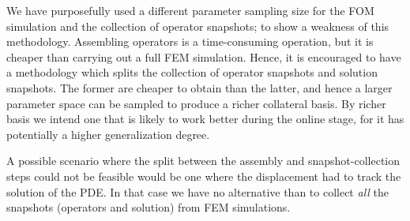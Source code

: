 \documentclass[../../thesis.tex]{subfiles}
\begin{document}
We have purposefully used a different parameter sampling size 
for the FOM simulation and the collection of operator snapshots;
to show a weakness of this methodology.
Assembling operators is a time-consuming operation, 
but it is cheaper than carrying out a full FEM simulation.
Hence, it is encouraged to have a methodology which splits the collection
of operator snapshots and solution snapshots.
The former are cheaper to obtain than the latter, 
and hence a larger parameter space can be sampled to produce a richer collateral basis.
By richer basis we intend one that is likely to work better during the online stage, 
for it has potentially a higher generalization degree.

A possible scenario where the split between the assembly and snapshot-collection steps
could not be feasible would be one where the displacement had to track the solution of the PDE.
In that case we have no alternative than to collect 
\textit{all} the snapshots (operators and solution) from FEM simulations.

\end{document}
